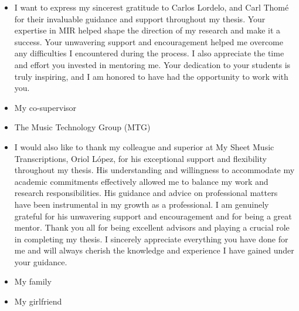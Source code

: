 

\begin{acknowledgement}

\begin{itemize}
\item I want to express my sincerest gratitude to Carlos Lordelo, and Carl Thomé for their invaluable guidance and support throughout my thesis. Your expertise in MIR helped shape the direction of my research and make it a success. Your unwavering support and encouragement helped me overcome any difficulties I encountered during the process. I also appreciate the time and effort you invested in mentoring me. Your dedication to your students is truly inspiring, and I am honored to have had the opportunity to work with you.
\vspace*{3mm}
\item My co-supervisor
\vspace*{3mm}
\item The Music Technology Group (MTG)
\vspace*{3mm}
\item I would also like to thank my colleague and superior at My Sheet Music Transcriptions, Oriol López, for his exceptional support and flexibility throughout my thesis. His understanding and willingness to accommodate my academic commitments effectively allowed me to balance my work and research responsibilities. His guidance and advice on professional matters have been instrumental in my growth as a professional. I am genuinely grateful for his unwavering support and encouragement and for being a great mentor.
\vspace*{3mm}
Thank you all for being excellent advisors and playing a crucial role in completing my thesis. I sincerely appreciate everything you have done for me and will always cherish the knowledge and experience I have gained under your guidance.
\vspace*{3mm}
\item My family
\vspace*{3mm}
\item My girlfriend
\vspace*{3mm}
\end{itemize}

\newpage
\end{acknowledgement}